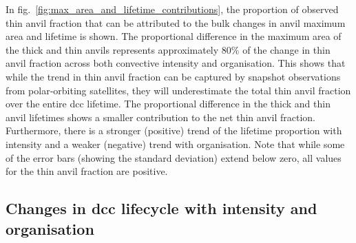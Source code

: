 In fig.~\ref{fig:max_area_and_lifetime_contributions}, the proportion of observed thin anvil fraction that can be attributed to the bulk changes in anvil maximum area and lifetime is shown.
The proportional difference in the maximum area of the thick and thin anvils represents approximately 80\% of the change in thin anvil fraction across both convective intensity and organisation.
This shows that while the trend in thin anvil fraction can be captured by snapshot observations from polar-orbiting satellites, they will underestimate the total thin anvil fraction over the entire \acrshort{dcc} lifetime.
The proportional difference in the thick and thin anvil lifetimes shows a smaller contribution to the net thin anvil fraction.
Furthermore, there is a stronger (positive) trend of the lifetime proportion with intensity and a weaker (negative) trend with organisation.
Note that while some of the error bars (showing the standard deviation) extend below zero, all values for the thin anvil fraction are positive.



\subsection{Changes in \acrshort{dcc} lifecycle with intensity and organisation} \label{sec:lifecycle_results}

